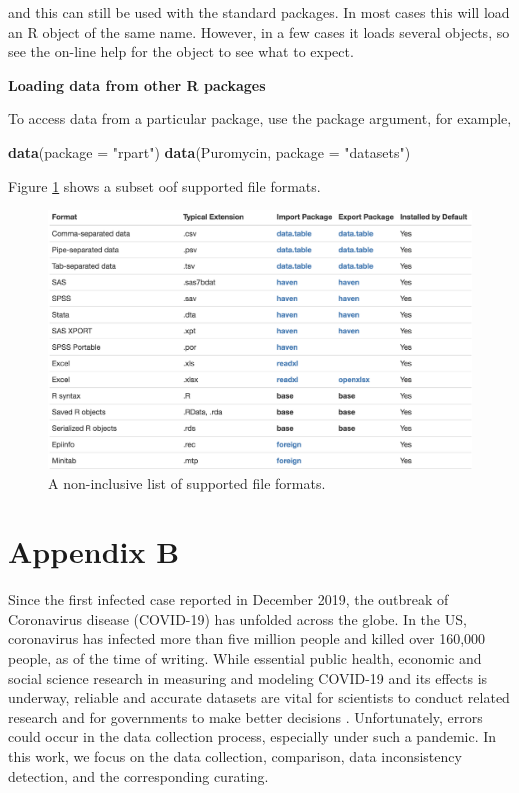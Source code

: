 \documentclass[]{book}
\newenvironment{Shaded}{\begin{snugshade}}{\end{snugshade}}
\newcommand{\KeywordTok}[1]{\textcolor[rgb]{0.13,0.29,0.53}{\textbf{#1}}}
\newcommand{\DataTypeTok}[1]{\textcolor[rgb]{0.13,0.29,0.53}{#1}}
\newcommand{\StringTok}[1]{\textcolor[rgb]{0.31,0.60,0.02}{#1}}
\newcommand{\NormalTok}[1]{#1}
\begin{document}
and this can still be used with the standard packages. In most cases
this will load an R object of the same name. However, in a few cases it
loads several objects, so see the on-line help for the object to see
what to expect.

\textbf{Loading data from other R packages}

To access data from a particular package, use the package argument, for
example,

\begin{Shaded}
\begin{Highlighting}[]
\KeywordTok{data}\NormalTok{(}\DataTypeTok{package =} \StringTok{"rpart"}\NormalTok{)}
\KeywordTok{data}\NormalTok{(Puromycin, }\DataTypeTok{package =} \StringTok{"datasets"}\NormalTok{)}
\end{Highlighting}
\end{Shaded}

Figure \ref{fig:import} shows a subset oof supported file formats.

\begin{figure}

{\centering \includegraphics[width=0.9\linewidth]{figures/import} 

}

\caption{A non-inclusive list of supported file formats.}\label{fig:import}
\end{figure}

\chapter{Appendix B}\label{appendix-b}

Since the first infected case reported in December 2019, the outbreak of
Coronavirus disease (COVID-19) has unfolded across the globe. In the US,
coronavirus has infected more than five million people and killed over
160,000 people, as of the time of writing. While essential public
health, economic and social science research in measuring and modeling
COVID-19 and its effects is underway, reliable and accurate datasets are
vital for scientists to conduct related research and for governments to
make better decisions \citep{killeen2020county}. Unfortunately, errors
could occur in the data collection process, especially under such a
pandemic. In this work, we focus on the data collection, comparison,
data inconsistency detection, and the corresponding curating.
\end{document}
